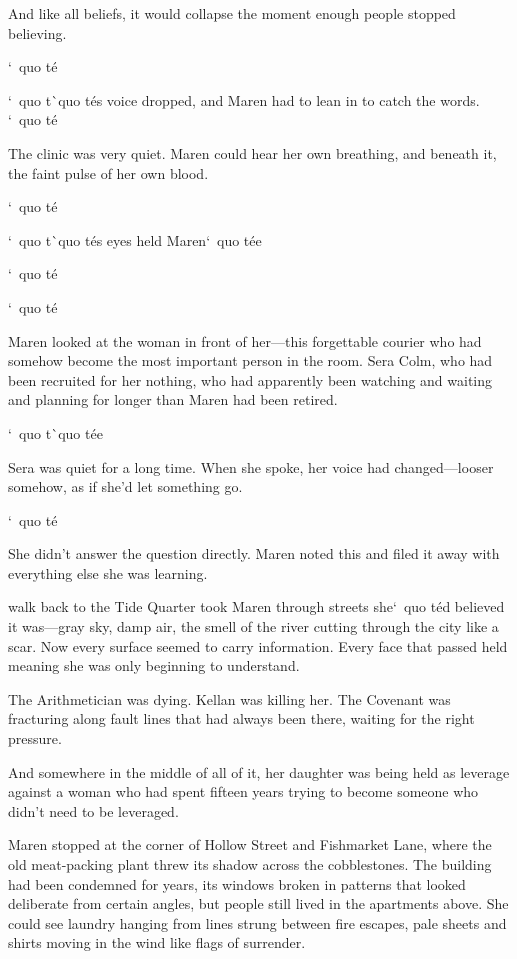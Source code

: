 \documentclass[12pt,letterpaper,openany]{book}
\begin{document}
\par
And like all beliefs, it would collapse the moment enough people stopped believing.
\par
`\ quo t\'e{}
\par
`\ quo t\`\ quo t\'e{}s voice dropped, and Maren had to lean in to catch the words. `\ quo t\'e{}
\par
The clinic was very quiet. Maren could hear her own breathing, and beneath it, the faint pulse of her own blood.
\par
`\ quo t\'e{}
\par
`\ quo t\`\ quo t\'e{}s eyes held Maren`\ quo t\'e{}e{}
\par
`\ quo t\'e{}
\par
`\ quo t\'e{}
\par
Maren looked at the woman in front of her—this forgettable courier who had somehow become the most important person in the room. Sera Colm, who had been recruited for her nothing, who had apparently been watching and waiting and planning for longer than Maren had been retired.
\par
`\ quo t\`\ quo t\'e{}e{}
\par
Sera was quiet for a long time. When she spoke, her voice had changed—looser somehow, as if she'd let something go.
\par
`\ quo t\'e{}
\par
She didn't answer the question directly. Maren noted this and filed it away with everything else she was learning.
\par
\hrulefillThe walk back to the Tide Quarter took Maren through streets she`\ quo t\'e{}d believed it was—gray sky, damp air, the smell of the river cutting through the city like a scar. Now every surface seemed to carry information. Every face that passed held meaning she was only beginning to understand.
\par
The Arithmetician was dying. Kellan was killing her. The Covenant was fracturing along fault lines that had always been there, waiting for the right pressure.
\par
And somewhere in the middle of all of it, her daughter was being held as leverage against a woman who had spent fifteen years trying to become someone who didn't need to be leveraged.
\par
Maren stopped at the corner of Hollow Street and Fishmarket Lane, where the old meat-packing plant threw its shadow across the cobblestones. The building had been condemned for years, its windows broken in patterns that looked deliberate from certain angles, but people still lived in the apartments above. She could see laundry hanging from lines strung between fire escapes, pale sheets and shirts moving in the wind like flags of surrender.
\end{document}
